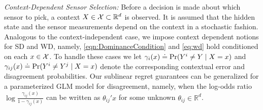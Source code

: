 \noindent
{\it Context-Dependent Sensor Selection:}
Before a decision is made about which sensor to pick, a context $X \in {\cal X} \subset \mathbb{R}^d$ is observed.
It is assumed that the hidden state and the sensor measurements depend on the context in a stochastic fashion.
Analogous to the context-independent case, we impose context dependent notions for SD and WD, namely, \cref{eqn:DominanceCondition} and \cref{eq:wd} hold conditioned on each $x \in {\cal X}$. To handle these cases we let $\gamma_i(x)\doteq \Pr(Y^{i} \neq Y\mid X= x)$ and $\gamma_{ij}(x) \doteq \Pr(Y^{i} \neq Y^{j}\mid X=x)$ denote the corresponding contextual error and disagreement probabilities. Our sublinear regret guarantees can be generalized for a parameterized GLM model for disagreement, namely, when the log-odds ratio $\log \frac{\gamma_{ij}(x)}{1-\gamma_{ij}(x)}$ can be written as $\theta_{ij}'x$ for some unknown $\theta_{ij} \in \mathbb{R}^d$.
\vspace{-5pt}

